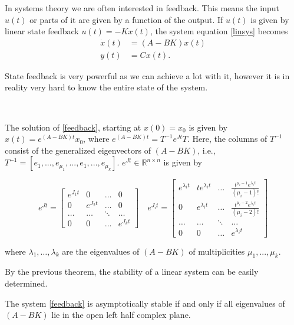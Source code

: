 In systems theory we are often interested in feedback. This means the input $u(t)$ or parts of it are given by a function of the output. If $u(t)$ is given by linear state feedback $u(t) = 
-K x(t)$, the system equation \eqref{linsys} becomes
\begin{subequations}
\label{feedback}
\begin{align}\dot{x}(t) &= (A -BK)x(t)
\\ y(t) &= C x(t)
.\end{align}
\end{subequations}


State feedback is very powerful as we can achieve a lot with it, however it is in reality very hard to know the entire state of the system.

\

\begin{theorem}
The solution of \eqref{feedback}, starting at $x(0)=x_0$ is given by $x(t) = e^{(A-BK) t}x_0$,
where
$e^{(A-BK)t} =T^{-1}e^{Jt}T$.
Here, the columns of $T^{-1}$ consist of the generalized eigenvectors of $( A -B K )$, i.e., $T^{-1} =
 [e_1,...,e_{\mu_1},...,e_1,...,e_{\mu_k}]$. $e^{Jt} \in \mathbb{R}^{n\times n}$ is given by 
 
 \[e^{Jt}=\begin{bmatrix} e^{J_1 t} &0 &\dots& 0 \\
0& e^{J_2 t }& \dots & 0\\ 
 \ldots& \ldots& \ddots& \ldots\\
 0 & 0 & \dots &e^{J_kt}
 \end{bmatrix} \quad e^{J_it}=\begin{bmatrix} e^{\lambda_i t} & te^{\lambda_i t} &\dots& \frac{t^{\mu_i -1}e^{\lambda_i t}}{(\mu_i -1)!}\\
0& e^{\lambda_i t}& \dots & \frac{t^{\mu_i -2}e^{\lambda_i t}}{(\mu_i -2)!}\\ 
 \ldots& \ldots& \ddots& \ldots\\
 0 & 0 & \dots &e^{\lambda_i t}
 \end{bmatrix}\]

where $\lambda_1,\dots, \lambda_k$ are the eigenvalues of $(A -BK)$ of multiplicities $\mu_1,...,\mu_k$.
\end{theorem}
By the previous theorem, the stability of a linear system can be easily determined.
\begin{corollary}
The system \eqref{feedback} is asymptotically stable if and only if all eigenvalues of $(A-BK) $ lie in the open left half complex plane.
\end{corollary}
